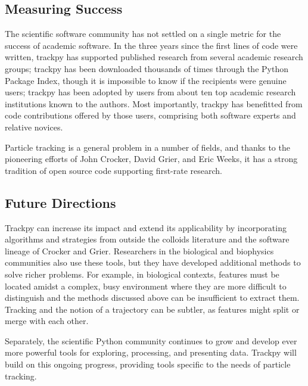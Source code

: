 \subsection{Measuring Success}
The scientific software community has not settled on a single metric for the success of academic software. In the three years since the first lines of code were written, trackpy has supported published research from several academic research groups; trackpy has been downloaded thousands of times through the Python Package Index, though it is impossible to know if the recipients were genuine users; trackpy has been adopted by users from about ten top academic research institutions known to the authors. Most importantly, trackpy has benefitted from code contributions offered by those users, comprising both software experts and relative novices.

Particle tracking is a general problem in a number of fields, and thanks to the pioneering efforts of John Crocker, David Grier, and Eric Weeks, it has a strong tradition of open source code supporting first-rate research.

\subsection{Future Directions}

Trackpy can increase its impact and extend its applicability by incorporating algorithms and strategies from outside the colloids literature and the software lineage of Crocker and Grier. Researchers in the biological and biophysics communities also use these tools, but they have developed additional methods to solve richer problems. For example, in biological contexts, features must be located amidst a complex, busy environment where they are more difficult to distinguish and the methods discussed above can be insufficient to extract them. Tracking and the notion of a trajectory can be subtler, as features might split or merge with each other.

Separately, the scientific Python community continues to grow and develop ever more powerful tools for exploring, processing, and presenting data. Trackpy will build on this ongoing progress, providing tools specific to the needs of particle tracking.